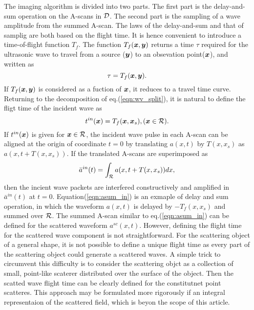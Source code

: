 ﻿\documentclass[11pt,a4j]{article}
\begin{document}
The imaging algorithm is divided into two parts.
The first part is the delay-and-sum operation on the A-scans in ${\cal D}$. 
The second part is the sampling of a wave amplitude from the summed A-scan.
The laws of the delay-and-sum and that of samplig are both based on the flight time.
It is hence convenient to introduce a time-of-flight function $T_f$.
The function $T_f(\mbox{\boldmath $x$},\mbox{\boldmath $y$})$ returns a time $\tau$ required for the ultrasonic 
wave to travel from a source ($\mbox{\boldmath $y$}$) to an obsevation point($\mbox{\boldmath $x$}$), and written as 
\begin{equation}
	\tau=T_f(\mbox{\boldmath $x$},\mbox{\boldmath $y$}).
	\label{eqn:Tf}
\end{equation}
If $T_f(\mbox{\boldmath $x$},\mbox{\boldmath $y$})$ is considered as a fuction of $\mbox{\boldmath $x$}$, it reduces to a travel time curve. 
Returning to the decomposition of eq.(\ref{eqn:wv_split}), it is natural to define 
the fligt time of the incident wave as 
\begin{equation}
	t^{in}(\mbox{\boldmath $x$})=T_f(\mbox{\boldmath $x$},\mbox{\boldmath $x$}_s), (\mbox{\boldmath $x$} \in {\cal R}).
	\label{eqn:def_tin}
\end{equation}
If $t^{in}(\mbox{\boldmath $x$})$ is given for $\mbox{\boldmath $x$} \in {\cal R}$, the incident wave pulse 
in each A-scan can be aligned at the origin of coordinate $t=0$ by translating 
$a(x,t)$ by $T(x,x_s)$ as $a(x,t+T(x,x_s))$.
If the translated A-scans are superimposed as 
\begin{equation}
	\bar{a}^{in}(t)=\int_{\cal R} a(x,t+T(x,x_s))dx,
	\label{eqn:asum_in}
\end{equation}
then the incient wave packets are interfered constructively and amplified in $\bar{a}^{in}(t)$ at $t=0$.
Equation(\ref{eqn:asum_in}) is an exmaple of delay and sum operation, in which the waveform $a(x,t)$ 
is delayed by $-T_f(x,x_s)$ and summed over $\cal R$.
The summed A-scan similar to eq.(\ref{eqn:asum_in}) can be defined for the scattered waveform $a^{sc}(x,t)$. 
However, defining the flight time for the scattered wave component is not straightforward. 
For the scattering object of a general shape, it is not possible to define a unique flight time as every
 part of the scattering object could generate a scattered waves. 
 A simple trick to circumvent this difficulty is to consider the scattering objct as a  collection of 
 small, point-like scaterer distributed over the surface of the object. 
 Then the scatted wave flight time can be clearly defined for the constitutnet point scatteres. 
 This approach may be formulated more rigorously if an integral representaion of the scattered field, 
 which is beyon the scope of this article.
\end{document}

